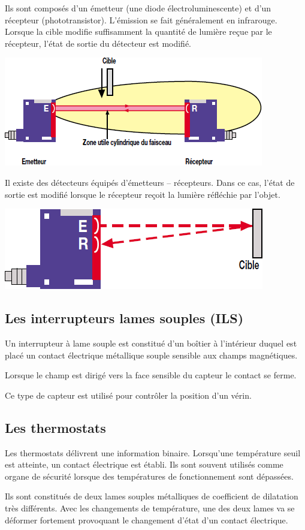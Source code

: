 \documentclass[10pt]{article}
\begin{document}
Ils sont composés d'un émetteur (une diode électroluminescente) et d'un récepteur (phototransistor). L'émission se fait généralement en infrarouge. Lorsque la cible modifie suffisamment la quantité de lumière reçue par le récepteur, l'état de sortie du détecteur est modifié. 

\begin{center}
\includegraphics[width=.4\textwidth]{images/photo_2}
\end{center}

Il existe des détecteurs équipés d'émetteurs -- récepteurs. Dans ce cas, l'état de sortie est modifié lorsque le récepteur reçoit la lumière réfléchie par l'objet.

\begin{center}
\includegraphics[width=.4\textwidth]{images/photo_3}
\end{center}

\subsection{Les interrupteurs lames souples (ILS)}
Un interrupteur à lame souple est constitué d'un boîtier à l'intérieur duquel est placé un contact électrique métallique souple sensible aux champs magnétiques.

Lorsque le champ est dirigé vers la face sensible du capteur le contact se ferme.

Ce type de capteur est utilisé pour contrôler la position d'un vérin.

\subsection{Les thermostats}
Les thermostats délivrent une information binaire. Lorsqu'une température seuil est atteinte, un contact électrique est établi. Ils sont souvent utilisés comme organe de sécurité lorsque des températures de fonctionnement sont dépassées. 

Ils sont constitués de deux lames souples métalliques de coefficient de dilatation très différents. Avec les changements de température, une des deux lames va se déformer fortement provoquant le changement d'état d'un contact électrique. 
\end{document}
